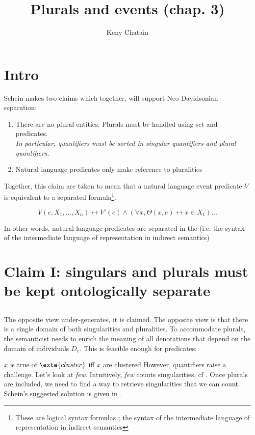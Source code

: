 \documentclass[english]{article}
\title{Plurals and events (chap. 3)}
\author{Keny Chatain}
\begin{document}
\maketitle

\section*{Intro}
Schein makes two claims which together, will support Neo-Davidsonian separation:

\begin{enumerate}
\item There are no plural entities. Plurals must be handled using set and predicates.\\
\emph{In particular, quantifiers must be sorted in singular quantifiers and plural quantifiers.}
\item Natural language predicates only make reference to pluralities
\end{enumerate}
%
Together, this claim are taken to mean that a natural language event predicate $V$ is equivalent to a separated formula\footnote{These are logical syntax formulas ; the syntax of the intermediate language of representation in indirect semantics}. 

$$V(e, X_1, \ldots, X_n) \leftrightarrow V'(e) \wedge \left( \forall x, \Theta(x, e) \leftrightarrow x\in X_1\right) \ldots $$

In other words, natural language predicates are separated in the  (i.e. the syntax of the intermediate language of representation in indirect semantics)

\section*{Claim I: singulars and plurals must be kept ontologically separate}

\subsection{}


The opposite view under-generates, it is claimed. The opposite view is that there is a single domain of both singularities and pluralities. To accommodate plurals, the semanticist needs to enrich the meaning of all denotations that depend on the domain of individuals $D_e$. This is feasible enough for predicates:

\ex
$x$ is true of $\exte{cluster}$ iff $x$ are clustered
\xe
%
However, quantifiers raise a challenge. Let's look at \emph{few}. Intuitively, \emph{few} counts singularities, cf . Once plurals are included, we need to find a way to retrieve singularities that we can count. Schein's suggested solution is given in .
\end{document}
